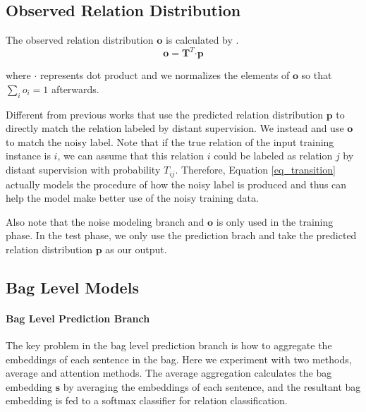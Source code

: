 \subsection{Observed Relation Distribution}
The observed relation distribution $\mathbf{o}$ is calculated by . %
 \begin{equation}
\mathbf{o} = \mathbf{T}^T \bm\cdot \mathbf{p}
\label{eq_transition}
 \end{equation}

 where $\bm\cdot$ represents dot product and we normalizes the elements of $\mathbf{o}$ so that $\sum_i{o_i}=1$ afterwards.

Different from previous works that use the predicted relation distribution $\mathbf{p}$ to directly match the relation labeled by distant supervision. We instead  and use $\mathbf{o}$ to match the noisy label. Note that if the true relation of the input training instance is $i$, we can assume that this relation $i$ could be labeled as relation $j$ by distant supervision with probability $T_{ij}$. Therefore, Equation \ref{eq_transition} actually models the procedure of how the noisy label is produced and thus can help the model make better use of the noisy training data. 

Also note that the noise modeling branch and $\mathbf{o}$ is only used in the training phase. In the test phase, we only use the prediction brach and take the predicted relation distribution $\mathbf{p}$ as our output. 

\subsection{Bag Level Models}
\paragraph{Bag Level Prediction Branch}
The key problem in the bag level prediction branch is how to aggregate the embeddings of each sentence in the bag. Here we experiment with two methods, average and attention methods. The average aggregation calculates the bag embedding $\mathbf{s}$ by averaging the embeddings of each sentence, and the resultant bag embedding is fed to a softmax classifier for relation classification.

